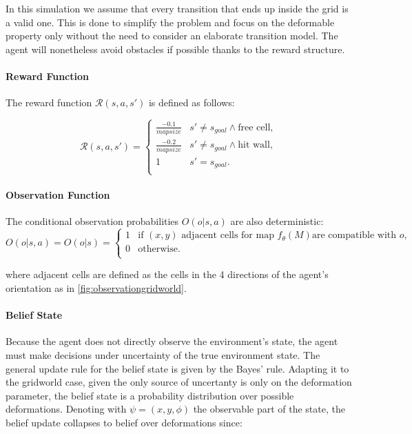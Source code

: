 In this simulation we assume that every transition that ends up inside the grid is a valid 
one. 
This is done to simplify the problem and focus on the deformable property only without 
the need to consider an elaborate transition model. The agent will nonetheless avoid 
obstacles if possible thanks to the reward structure.

\paragraph{Reward Function}

The reward function $\mathcal{R}(s,a,s')$ is defined as follows:


 $$\mathcal{R}(s,a,s') = 
    \begin{cases}
    \frac{-0.1}{mapsize} &   s' \neq s_{goal} \wedge \text{free cell}, \\ 
    \frac{-0.2}{mapsize} &   s' \neq s_{goal}  \wedge \text{hit wall},\\
    1 &   s' = s_{goal}. \\
    \end{cases}    
$$


\paragraph{Observation Function} The conditional observation probabilities $O(o|s,a)$ 
are also deterministic:
$$O(o|s,a)= O(o|s) = 
\begin{cases}
    1 &   \text{if } (x,y) \text{ adjacent cells for map } f_\theta(M) \text{are compatible with } o,\\
    0 &   \text{otherwise}. \\
\end{cases}
$$

where adjacent cells are defined as the cells in the 4 directions of the agent's orientation 
as in \cref{fig:observationgridworld}.

\paragraph{Belief State}
Because the agent does not directly observe the environment's state, the agent must make decisions under uncertainty of the true environment state. 
The general update rule for the belief state is given by the Bayes' rule.
Adapting it to the gridworld 
case, given the only source of uncertanty is only on the 
deformation parameter, the belief state is a probability distribution 
over possible deformations.
Denoting with $\psi = (x,y,\phi)$ the observable part of the state, the belief 
update collapses to belief over deformations since:

